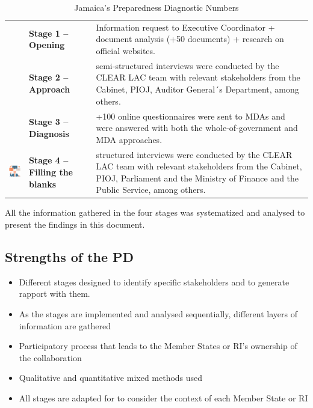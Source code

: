 \documentclass[
  10pt,
]{book}
\begin{document}
\begin{longtable}[]{@{}
  >{\raggedright\arraybackslash}p{}
  >{\centering\arraybackslash}p{}
  >{\raggedleft\arraybackslash}p{}@{}}
\caption{\label{tab:table1} Jamaica's Preparedness Diagnostic Numbers}\tabularnewline
\toprule
\endhead
& \textbf{Stage 1 -- Opening} & Information request to Executive Coordinator + document analysis (+50 documents) + research on official websites. \\
& \textbf{Stage 2 -- Approach} & 6 semi-structured interviews were conducted by the CLEAR LAC team with relevant stakeholders from the Cabinet, PIOJ, Auditor General´s Department, among others. \\
& \textbf{Stage 3 -- Diagnosis} & +100 online questionnaires were sent to MDAs and were answered with both the whole-of-government and MDA approaches. \\
\includegraphics{./images/tb1_4.png} & \textbf{Stage 4 -- Filling the blanks} & 7 structured interviews were conducted by the CLEAR LAC team with relevant stakeholders from the Cabinet, PIOJ, Parliament and the Ministry of Finance and the Public Service, among others. \\
\bottomrule
\end{longtable}

All the information gathered in the four stages was systematized and analysed to present the findings in this document.

\hypertarget{strengths-of-the-pd}{%
\subsection*{Strengths of the PD}\label{strengths-of-the-pd}}

\begin{itemize}
\item
  Different stages designed to identify specific stakeholders and to generate rapport with them.
\item
  As the stages are implemented and analysed sequentially, different layers of information are gathered
\item
  Participatory process that leads to the Member States or RI's ownership of the collaboration
\item
  Qualitative and quantitative mixed methods used
\item
  All stages are adapted for to consider the context of each Member State or RI
\end{itemize}
\end{document}
